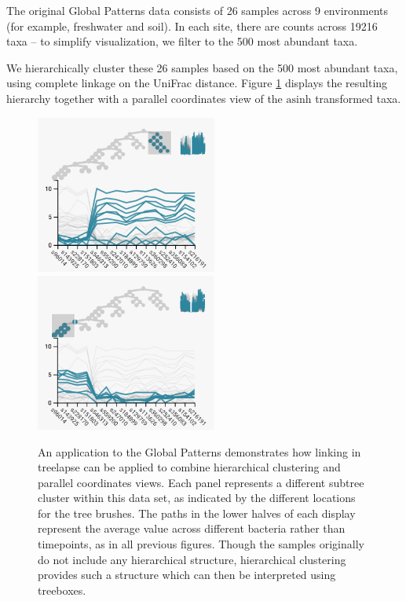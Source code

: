 \documentclass[12pt]{article}
\begin{document}
The original Global Patterns data consists of 26 samples across 9
environments (for example, freshwater and soil). In each site, there are
counts across 19216 taxa -- to simplify visualization, we filter to the
500 most abundant taxa.

We hierarchically cluster these 26 samples based on the 500 most
abundant taxa, using complete linkage on the UniFrac distance. Figure
\ref{fig:gptimebox} displays the resulting hierarchy together with a
parallel coordinates view of the \(\text{asinh}\) transformed taxa.

\begin{figure}
  {
    \centering
    \includegraphics[width=225px]{figure/gp_cluster1}
    \includegraphics[width=225px]{figure/gp_cluster2}
}

\caption{An application to the Global Patterns demonstrates how linking in
  treelapse can be applied to combine hierarchical clustering and parallel
  coordinates views. Each panel represents a different subtree cluster within
  this data set, as indicated by the different locations for the tree brushes.
  The paths in the lower halves of each display represent the average value
  across different bacteria rather than timepoints, as in all previous figures.
  Though the samples originally do not include any hierarchical structure,
  hierarchical clustering provides such a structure which can then be
  interpreted using treeboxes. }\label{fig:gptimebox}
\end{figure}
\end{document}

